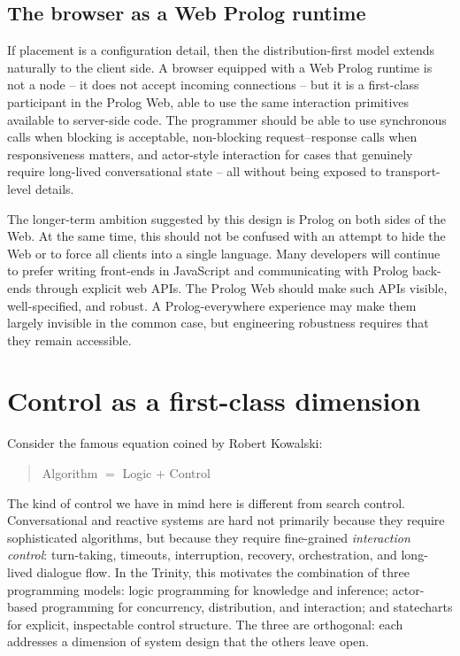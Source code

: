 \subsection{The browser as a Web Prolog runtime}\label{sec:paradigm-browser}

If placement is a configuration detail, then the distribution-first
model extends naturally to the client side. A browser equipped with a
Web Prolog runtime is not a node -- it does not accept incoming
connections -- but it is a first-class participant in the Prolog Web,
able to use the same interaction primitives available to server-side
code. The programmer should be able to use synchronous calls when
blocking is acceptable, non-blocking request--response calls when
responsiveness matters, and actor-style interaction for cases that
genuinely require long-lived conversational state -- all without being
exposed to transport-level details.

The longer-term ambition suggested by this design is Prolog on both
sides of the Web. At the same time, this should not be confused with an attempt to hide
the Web or to force all clients into a single language. Many developers
will continue to prefer writing front-ends in JavaScript and
communicating with Prolog back-ends through explicit web APIs. The
Prolog Web should make such APIs visible, well-specified, and robust. A
Prolog-everywhere experience may make them largely invisible in the
common case, but engineering robustness requires that they remain
accessible.


\section{Control as a first-class dimension}\label{sec:paradigm-control}

Consider the famous equation coined by Robert Kowalski:

\begin{quotation}
\normalsize\noindent Algorithm $=$ Logic $+$ Control
\end{quotation}

\noindent The kind of control we have in mind here is different from
search control. Conversational and reactive systems are hard not
primarily because they require sophisticated algorithms, but because
they require fine-grained \emph{interaction control}: turn-taking,
timeouts, interruption, recovery, orchestration, and long-lived
dialogue flow. In the Trinity, this motivates the combination of three
programming models: logic programming for knowledge and inference;
actor-based programming for concurrency, distribution, and interaction;
and statecharts for explicit, inspectable control structure. The three
are orthogonal: each addresses a dimension of system design that the
others leave open.


